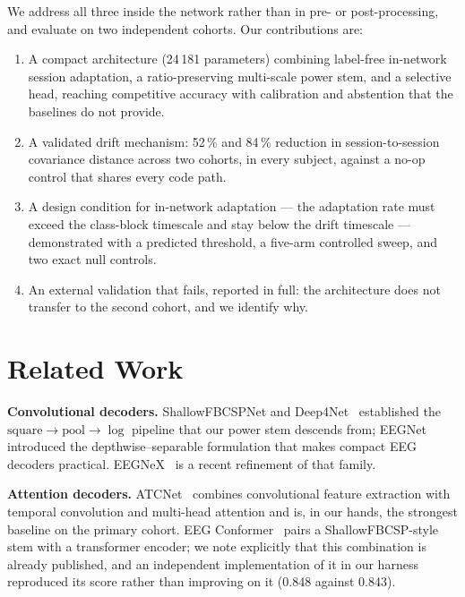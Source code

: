 \documentclass[preprint,12pt]{elsarticle}
\begin{document}
We address all three inside the network rather than in pre- or post-processing,
and evaluate on two independent cohorts. Our contributions are:

\begin{enumerate}
\item A compact architecture (24\,181 parameters) combining label-free in-network
      session adaptation, a ratio-preserving multi-scale power stem, and a
      selective head, reaching competitive accuracy with calibration and
      abstention that the baselines do not provide.
\item A validated drift mechanism: 52\,\% and 84\,\% reduction in
      session-to-session covariance distance across two cohorts, in every
      subject, against a no-op control that shares every code path.
\item A design condition for in-network adaptation --- the adaptation rate must
      exceed the class-block timescale and stay below the drift timescale ---
      demonstrated with a predicted threshold, a five-arm controlled sweep, and
      two exact null controls.
\item An external validation that fails, reported in full: the architecture does
      not transfer to the second cohort, and we identify why.
\end{enumerate}

\section{Related Work}

\textbf{Convolutional decoders.} ShallowFBCSPNet and Deep4Net~\cite{schirrmeister}
established the $\mathrm{square} \rightarrow \mathrm{pool} \rightarrow \log$
pipeline that our power stem descends from; EEGNet~\cite{lawhern} introduced the
depthwise--separable formulation that makes compact EEG decoders practical.
EEGNeX~\cite{eegnex} is a recent refinement of that family.

\textbf{Attention decoders.} ATCNet~\cite{atcnet} combines convolutional feature
extraction with temporal convolution and multi-head attention and is, in our
hands, the strongest baseline on the primary cohort. EEG
Conformer~\cite{conformer} pairs a ShallowFBCSP-style stem with a transformer
encoder; we note explicitly that this combination is already published, and an
independent implementation of it in our harness reproduced its score rather than
improving on it (0.848 against 0.843).
\end{document}
